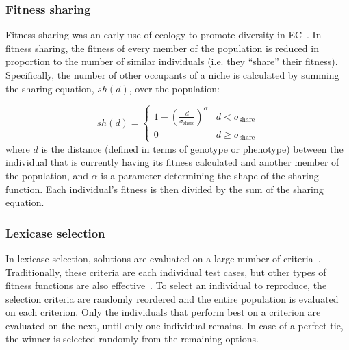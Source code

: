 \subsubsection{Fitness sharing}

Fitness sharing was an early use of ecology to promote diversity in EC~\cite{goldberg_genetic_1987}. In fitness sharing, the fitness of every member of the population is reduced in proportion to the number of similar individuals (i.e. they ``share'' their fitness). Specifically, the number of other occupants of a niche is calculated by summing the sharing equation, $sh(d)$, over the population:

\begin{equation} sh(d) =    \begin{cases}
      1 - (\frac{d}{\sigma_{\text{share}}})^{\alpha} & d < \sigma_{\text{share}}\\
      0 &  d \geq \sigma_{\text{share}}  
   \end{cases}
\label{eq:fit_share}
\end{equation}
where $d$ is the distance (defined in terms of genotype or phenotype) between the individual that is currently having its fitness calculated and another member of the population, and $\alpha$ is a parameter determining the shape of the sharing function. Each individual's fitness is then divided by the sum of the sharing equation.

\subsubsection{Lexicase selection}

In lexicase selection, solutions are evaluated on a large number of criteria~\cite{spector_assessment_2012}. Traditionally, these criteria are each individual test cases, but other types of fitness functions are also effective~\cite{dolson_applying_2018}. To select an individual
to reproduce, the selection criteria are randomly reordered and the entire population is evaluated on each criterion. Only the individuals that perform best on a criterion are evaluated on the next, until only one individual remains. In case of a perfect tie, the winner is selected randomly from the remaining options.

